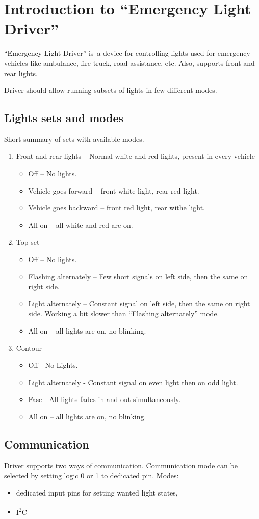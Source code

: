 \section{Introduction to ``Emergency Light Driver''}
``Emergency Light Driver'' is~a device for controlling lights used for emergency vehicles like
ambulance, fire truck, road assistance, etc. Also, supports front and rear lights.

Driver should allow running subsets of lights in few different modes.

\subsection{Lights sets and modes}
Short summary of sets with available modes.

\begin{enumerate}
	\item Front and rear lights -- Normal white and red lights, present in every vehicle
	\begin{itemize}
		\item Off -- No lights.
		\item Vehicle goes forward -- front white light, rear red light.
		\item Vehicle goes backward -- front red light, rear withe light.
		\item All on -- all white and red are on.
	\end{itemize}
	
	\item Top set
	\begin{itemize}
		\item Off -- No lights.
		\item Flashing alternately -- Few short signals on left side, then the same on right side.
		\item Light alternately -- Constant signal on left side, then the same on right side. Working a bit slower than ``Flashing alternately'' mode.
		\item All on -- all lights are on, no blinking.
	\end{itemize}
		
	\item Contour
	\begin{itemize}
		\item Off - No Lights.
		\item Light alternately - Constant signal on even light then on odd light.
		\item Fase - All lights fades in and out simultaneously.
		\item All on -- all lights are on, no blinking.
	\end{itemize}
\end{enumerate}

\subsection{Communication}
Driver supports two ways of communication. Communication mode can be selected by setting logic 0 or 1 to dedicated pin.
\newline
Modes:
\begin{itemize}
	\item dedicated input pins for setting wanted light states,
	\item I\textsuperscript{2}C
\end{itemize}
